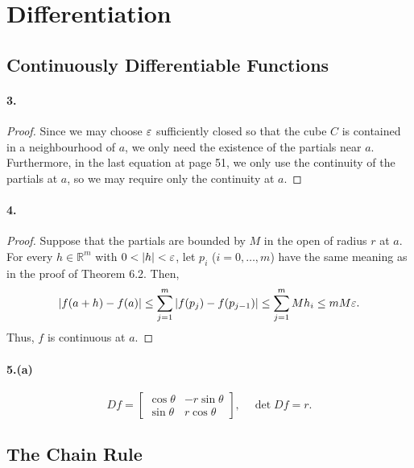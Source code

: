\section{Differentiation}
\setcounter{subsection}{5}
\subsection{Continuously Differentiable Functions}
  \paragraph{3.}
  \begin{proof}
    Since we may choose $\varepsilon$ sufficiently closed so that the cube $C$ is 
    contained in a neighbourhood of $a$, we only need the existence of the 
    partials near $a$. Furthermore, in the last equation at page 51, we only use
    the continuity of the partials at $a$, so we may require only the continuity
    at $a$.
  \end{proof}
  
  \paragraph{4.}
  \begin{proof}
    Suppose that the partials are bounded by $M$ in the open of radius $r$ at 
    $a$. For every $h\in\mathbb{R}^m$ with $0<|h|<\vep$, let $p_i$ ($i=0,\dots,
    m$) have the same meaning as in the proof of Theorem 6.2. Then,
    \begin{align*}
      |f(a+h)-f(a)|
      \le \sum_{j=1}^m|f(p_j)-f(p_{j-1})|\le\sum_{j=1}^m Mh_i\le mM\varepsilon.
    \end{align*}
    Thus, $f$ is continuous at $a$.
  \end{proof}
  
  \paragraph{5.(a)}
  \begin{solution}
    \[
      Df=\begin{bmatrix}
        \cos\theta & -r\sin\theta \\ \sin\theta & r\cos\theta
      \end{bmatrix},\quad
      \det Df =r.
    \]
  \end{solution}
\subsection{The Chain Rule}
